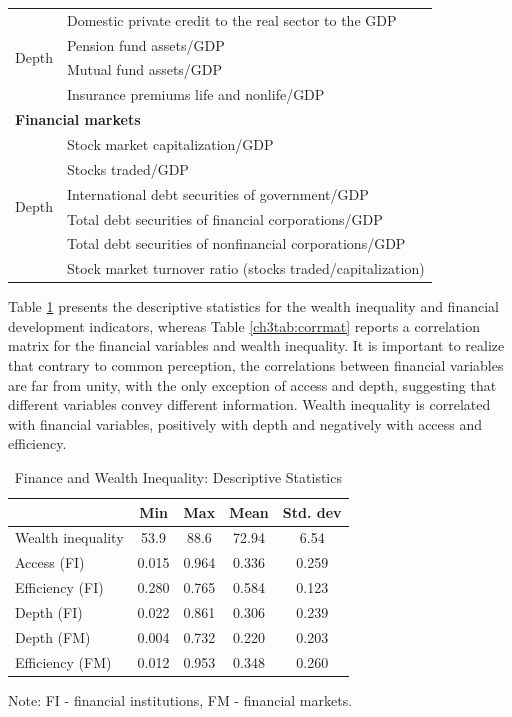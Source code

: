 \begin{refsection}
\begin{table}[ht!]
\begin{tabular}{ll}
  \midrule
  \multirow{4}{*}{Depth}	& Domestic private credit to the real sector to the GDP \\
  							& Pension fund assets/GDP \\
  							& Mutual fund assets/GDP \\
  							& Insurance premiums life and nonlife/GDP \\
  \midrule
  \multicolumn{2}{l}{\textbf{Financial markets}} \\
  \midrule
  \multirow{6}{*}{Depth} 	& Stock market capitalization/GDP \\
  							& Stocks traded/GDP \\
  							& International debt securities of government/GDP \\
  							& Total debt securities of financial corporations/GDP \\
  							& Total debt securities of nonfinancial corporations/GDP \\
  \midrule
  Efficiency			& Stock market turnover ratio (stocks traded/capitalization) \\
  \bottomrule
\end{tabular}
\end{table}
%
%
%
Table \ref{ch3tab:descstat} presents the descriptive statistics for the wealth inequality and financial development indicators, whereas Table \ref{ch3tab:corrmat} reports a correlation matrix for the financial variables and wealth inequality. It is important to realize that contrary to common perception, the correlations between financial variables are far from unity, with the only exception of access and depth, suggesting that different variables convey different information. Wealth inequality is correlated with financial variables, positively with depth and negatively with access and efficiency.
%
%
\begin{table}[ht!]
\small
\centering
\caption{Finance and Wealth Inequality: Descriptive Statistics}
\label{ch3tab:descstat}
\begin{threeparttable}
\begin{tabular}{lcccc}
  \toprule
							& Min & Max & Mean & Std. dev \\ 
  \midrule
  Wealth inequality	& 53.9 & 88.6 &  72.94 & 6.54  \\ 
  Access (FI)		& 0.015 & 0.964 & 0.336 & 0.259 \\ 
  Efficiency (FI)   & 0.280 & 0.765 & 0.584 & 0.123 \\ 
  Depth (FI)		& 0.022 & 0.861 & 0.306 & 0.239 \\ 
  Depth (FM) 		& 0.004 & 0.732 & 0.220 & 0.203 \\ 
  Efficiency (FM)	& 0.012 & 0.953 & 0.348 & 0.260 \\ 
  \bottomrule
\end{tabular}
\begin{tablenotes}
\small
\item Note: FI - financial institutions, FM - financial markets.
\end{tablenotes}
\end{threeparttable}
\end{table}


\end{refsection}
